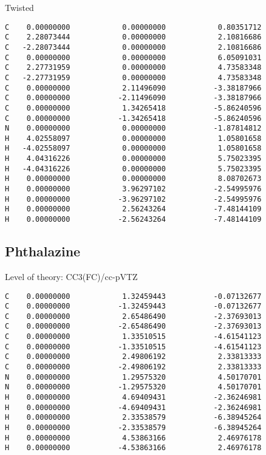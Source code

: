 \documentclass[journal=jctcce,manuscript=article,layout=traditional]{achemso}
\newcommand{\TZ}{cc-pVTZ}
\begin{document}
\begin{singlespace}
\noindent Twisted
\begin{verbatim}
C    0.00000000            0.00000000            0.80351712
C    2.28073444            0.00000000            2.10816686
C   -2.28073444            0.00000000            2.10816686
C    0.00000000            0.00000000            6.05091031
C    2.27731959            0.00000000            4.73583348
C   -2.27731959            0.00000000            4.73583348
C    0.00000000            2.11496090           -3.38187966
C    0.00000000           -2.11496090           -3.38187966
C    0.00000000            1.34265418           -5.86240596
C    0.00000000           -1.34265418           -5.86240596
N    0.00000000            0.00000000           -1.87814812
H    4.02558097            0.00000000            1.05801658
H   -4.02558097            0.00000000            1.05801658
H    4.04316226            0.00000000            5.75023395
H   -4.04316226            0.00000000            5.75023395
H    0.00000000            0.00000000            8.08702673
H    0.00000000            3.96297102           -2.54995976
H    0.00000000           -3.96297102           -2.54995976
H    0.00000000            2.56243264           -7.48144109
H    0.00000000           -2.56243264           -7.48144109
\end{verbatim}
\end{singlespace}

\subsection*{Phthalazine}

\begin{singlespace}
Level of theory: CC3(FC)/{\TZ}
\begin{verbatim}
C    0.00000000            1.32459443           -0.07132677
C    0.00000000           -1.32459443           -0.07132677
C    0.00000000            2.65486490           -2.37693013
C    0.00000000           -2.65486490           -2.37693013
C    0.00000000            1.33510515           -4.61541123
C    0.00000000           -1.33510515           -4.61541123
C    0.00000000            2.49806192            2.33813333
C    0.00000000           -2.49806192            2.33813333
N    0.00000000            1.29575320            4.50170701
N    0.00000000           -1.29575320            4.50170701
H    0.00000000            4.69409431           -2.36246981
H    0.00000000           -4.69409431           -2.36246981
H    0.00000000            2.33538579           -6.38945264
H    0.00000000           -2.33538579           -6.38945264
H    0.00000000            4.53863166            2.46976178
H    0.00000000           -4.53863166            2.46976178
\end{verbatim}
\end{singlespace}
\end{document}

